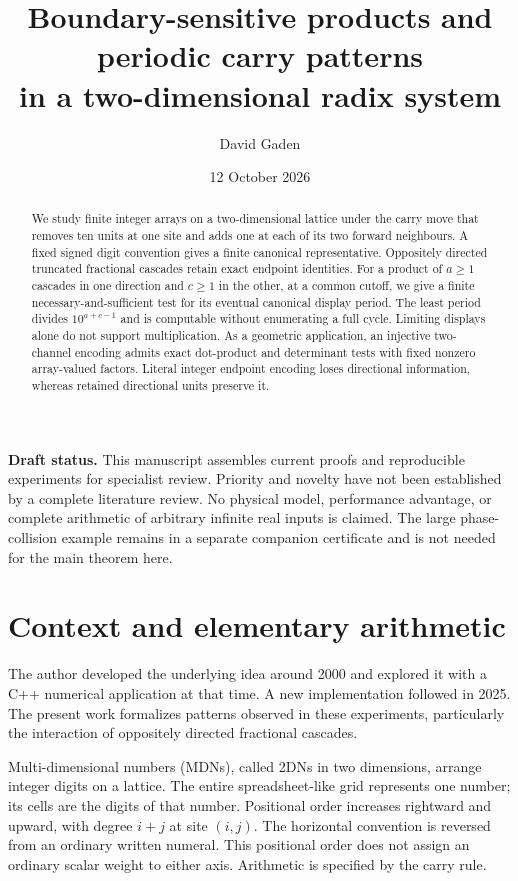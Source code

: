 \documentclass[11pt]{article}
\title{Boundary-sensitive products and periodic carry patterns\\in a two-dimensional radix system}
\author{David Gaden}
\date{12 October 2026}
\begin{document}
\maketitle
\begin{abstract}
We study finite integer arrays on a two-dimensional lattice under the
carry move that removes ten units at one site and adds one at each of its
two forward neighbours. A fixed signed digit convention gives a finite
canonical representative. Oppositely directed truncated fractional
cascades retain exact endpoint identities. For a product of $a\ge1$ cascades
in one direction and $c\ge1$ in the other, at a common cutoff, we give a finite
necessary-and-sufficient test for its eventual canonical display period.
The least period divides $10^{a+c-1}$ and is computable without enumerating
a full cycle. Limiting displays alone do not support multiplication.
As a geometric application, an injective two-channel encoding admits exact
dot-product and determinant tests with fixed nonzero array-valued factors.
Literal integer endpoint encoding loses directional information, whereas
retained directional units preserve it.
\end{abstract}

\noindent\textbf{Draft status.} This manuscript assembles current proofs and
reproducible experiments for specialist review. Priority and novelty have
not been established by a complete literature review. No physical model,
performance advantage, or complete arithmetic of arbitrary infinite real
inputs is claimed. The large phase-collision example remains in a separate
companion certificate and is not needed for the main theorem here.

\section{Context and elementary arithmetic}

The author developed the underlying idea around 2000 and explored it with
a C++ numerical application at that time. A new implementation followed
in 2025. The present work formalizes patterns observed in these experiments,
particularly the interaction of oppositely directed fractional cascades.

Multi-dimensional numbers (MDNs), called 2DNs in two dimensions, arrange
integer digits on a lattice. The entire spreadsheet-like grid represents
one number; its cells are the digits of that number. Positional order
increases rightward and upward, with degree $i+j$ at site $(i,j)$.
The horizontal convention is reversed from an ordinary written numeral.
This positional order does not assign an ordinary scalar weight to either
axis. Arithmetic is specified by the carry rule.
\end{document}
